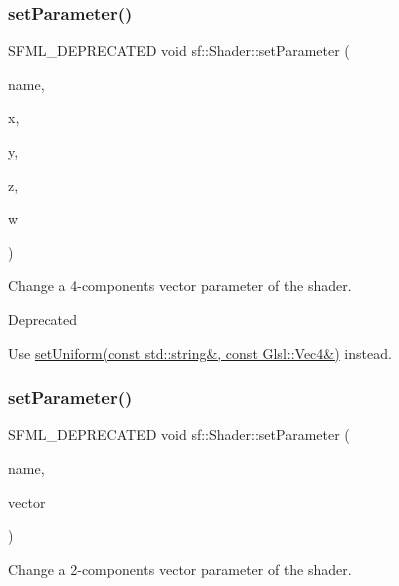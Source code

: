 \subsubsection{\texorpdfstring{set\+Parameter()}{setParameter()}\hspace{0.1cm}{\footnotesize\ttfamily [4/10]}}
{\footnotesize\ttfamily S\+F\+M\+L\+\_\+\+D\+E\+P\+R\+E\+C\+A\+T\+ED void sf\+::\+Shader\+::set\+Parameter (\begin{DoxyParamCaption}\item[{const std\+::string \&}]{name,  }\item[{float}]{x,  }\item[{float}]{y,  }\item[{float}]{z,  }\item[{float}]{w }\end{DoxyParamCaption})}



Change a 4-\/components vector parameter of the shader. 

\begin{DoxyRefDesc}{Deprecated}
\item[\hyperlink{deprecated__deprecated000010}{Deprecated}]Use \hyperlink{classsf_1_1_shader_abc1aee8343800680fd62e1f3d43c24bf}{set\+Uniform(const std\+::string\&, const Glsl\+::\+Vec4\&)} instead.\end{DoxyRefDesc}
\mbox{\label{classsf_1_1_shader_aee671dda9a84f607b9b780b2796def74}} 
\subsubsection{\texorpdfstring{set\+Parameter()}{setParameter()}\hspace{0.1cm}{\footnotesize\ttfamily [5/10]}}
{\footnotesize\ttfamily S\+F\+M\+L\+\_\+\+D\+E\+P\+R\+E\+C\+A\+T\+ED void sf\+::\+Shader\+::set\+Parameter (\begin{DoxyParamCaption}\item[{const std\+::string \&}]{name,  }\item[{const \hyperlink{classsf_1_1_vector2}{Vector2f} \&}]{vector }\end{DoxyParamCaption})}



Change a 2-\/components vector parameter of the shader. 

